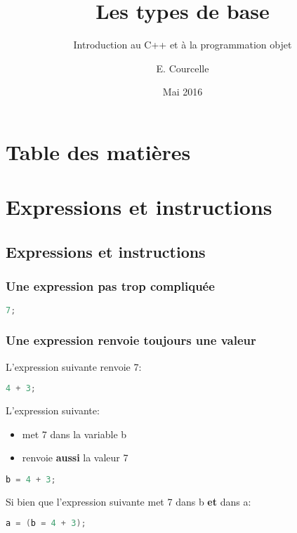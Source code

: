 \documentclass{beamer}
\title{Les types de base}
\subtitle{Introduction au C++ et à la programmation objet}
\author{E. Courcelle}\institute{CALMIP, UMS 3669}
\date{Mai 2016}
\begin{document}
\begin{frame}
\titlepage
\end{frame}

\section*{Table des matières}
\begin{frame}
\tableofcontents
\end{frame}


\section{Expressions et instructions}

\subsection{Expressions et instructions}

\begin{frame}[fragile=singleslide,shrink=20]
\frametitle {Une expression pas trop compliquée}
\begin{lstlisting}[language=c++]
7;
\end{lstlisting}
\end{frame}

\begin{frame}[fragile=singleslide,shrink=20]
\frametitle {Une expression renvoie toujours une valeur}
L'expression suivante renvoie 7:
\begin{lstlisting}[language=c++]
4 + 3;
\end{lstlisting}

L'expression suivante:
\begin{itemize}
\item{met 7 dans la variable b}
\item{renvoie \textbf{aussi} la valeur 7}
\end{itemize}
\begin{lstlisting}[language=c++]
b = 4 + 3;
\end{lstlisting}

Si bien que l'expression suivante met 7 dans b \textbf{et} dans a:
\begin{lstlisting}[language=c++]
a = (b = 4 + 3);
\end{lstlisting}
\end{frame}
\end{document}
